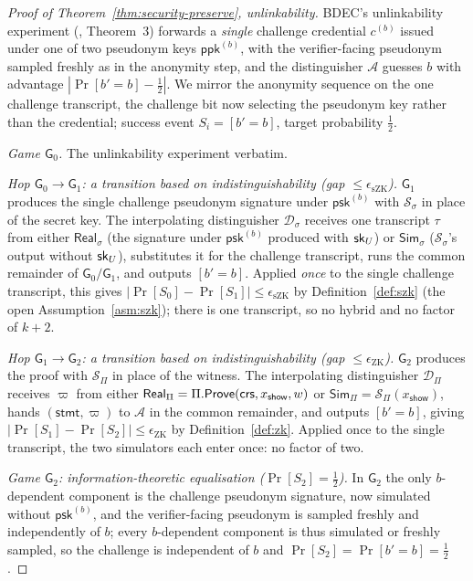 \begin{proof}[Proof of Theorem~\ref{thm:security-preserve}, unlinkability]
BDEC's unlinkability experiment (\cite[Appendix~A.3]{10.1007/978-981-96-0957-4_3}, Theorem~3) forwards a \emph{single} challenge credential $c^{(b)}$ issued under one of two pseudonym keys $\mathsf{ppk}^{(b)}$, with the verifier-facing pseudonym sampled freshly as in the anonymity step, and the distinguisher $\mathcal A$ guesses $b$ with advantage $|\Pr[b'=b]-\tfrac12|$. We mirror the anonymity sequence on the one challenge transcript, the challenge bit now selecting the pseudonym key rather than the credential; success event $S_i=[b'=b]$, target probability $\tfrac12$.

    \smallskip\noindent\emph{Game $\mathsf G_0$.} The unlinkability
experiment verbatim.

    \smallskip\noindent\emph{Hop $\mathsf G_0\to\mathsf G_1$: a transition based on
indistinguishability (gap $\le\epsilon_{\mathrm{sZK}}$).} $\mathsf G_1$ produces the single challenge pseudonym signature under $\mathsf{psk}^{(b)}$ with $\mathcal S_\sigma$ in place of the secret key. The interpolating distinguisher $\mathcal D_\sigma$ receives one transcript $\tau$ from either $\mathsf{Real}_\sigma$ (the signature under $\mathsf{psk}^{(b)}$ produced with $\mathsf{sk}_U$) or $\mathsf{Sim}_\sigma$ ($\mathcal S_\sigma$'s output without $\mathsf{sk}_U$), substitutes it for the challenge transcript, runs the common remainder of $\mathsf G_0/\mathsf G_1$, and outputs $[b'=b]$. Applied \emph{once} to the single challenge transcript, this gives $|\Pr[S_0]-\Pr[S_1]|\le\epsilon_{\mathrm{sZK}}$ by Definition~\ref{def:szk} (the open Assumption~\ref{asm:szk}); there is one transcript, so no hybrid and no factor of $k+2$.

    \smallskip\noindent\emph{Hop $\mathsf G_1\to\mathsf G_2$: a transition based on
indistinguishability (gap $\le\epsilon_{\mathrm{ZK}}$).} $\mathsf G_2$ produces the proof with $\mathcal S_\Pi$ in place of the witness. The interpolating distinguisher $\mathcal D_\Pi$ receives $\varpi$ from either $\mathsf{Real}_\Pi=\Pi.\mathsf{Prove}(\mathsf{crs},x_{\mathsf{show}},w)$ or $\mathsf{Sim}_\Pi=\mathcal S_\Pi(x_{\mathsf{show}})$, hands $(\mathsf{stmt},\varpi)$ to $\mathcal A$ in the common remainder, and outputs $[b'=b]$, giving $|\Pr[S_1]-\Pr[S_2]|\le\epsilon_{\mathrm{ZK}}$ by Definition~\ref{def:zk}. Applied once to the single transcript, the two simulators each enter once: no factor of two.

    \smallskip\noindent\emph{Game $\mathsf G_2$: information-theoretic
equalisation ($\Pr[S_2]=\tfrac12$).} In $\mathsf G_2$ the only $b$-dependent component is the challenge pseudonym signature, now simulated without $\mathsf{psk}^{(b)}$, and the verifier-facing pseudonym is sampled freshly and independently of $b$; every $b$-dependent component is thus simulated or freshly sampled, so the challenge is independent of $b$ and $\Pr[S_2]=\Pr[b'=b]=\tfrac12$.


\end{proof}
